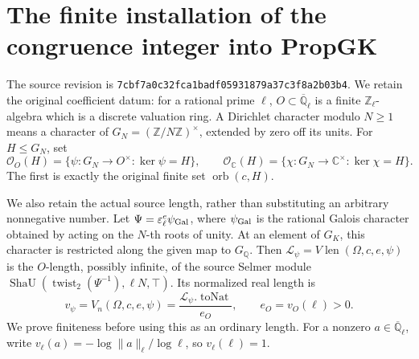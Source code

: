 \section{The finite installation of the congruence integer into PropGK}
\label{sec:prop-gk-installation-v046}


The source revision is
\texttt{7cbf7a0c32fca1badf05931879a37c3f8a2b03b4}.
We retain the original coefficient datum: for a rational prime
\(\ell\), \(O\subset\overline{\mathbb Q}_\ell\) is a finite
\(\mathbb Z_\ell\)-algebra which is a discrete valuation ring.
A Dirichlet character modulo \(N\ge1\) means a character of
\(G_N=(\mathbb Z/N\mathbb Z)^\times\), extended by zero off its
units. For \(H\le G_N\), set
\[
 \mathcal O_O(H)=\{\psi:G_N\to O^\times:\ker\psi=H\},\qquad
 \mathcal O_{\mathbb C}(H)=
       \{\chi:G_N\to\mathbb C^\times:\ker\chi=H\}.
 \tag{PGK.1}
\]
The first is exactly the original finite set \(\operatorname{orb}(c,H)\).

We also retain the actual source length, rather than substituting
an arbitrary nonnegative number. Let
\(\Psi=\varepsilon_\ell^e\psi_{\rm Gal}\), where
\(\psi_{\rm Gal}\) is the rational Galois character obtained by
acting on the \(N\)-th roots of unity. At an element of \(G_K\),
this character is restricted along the given map to \(G_{\mathbb Q}\).
Then
\(\mathcal L_\psi=V\!\operatorname{len}(\Omega,c,e,\psi)\) is the
\(O\)-length, possibly infinite, of the source Selmer module
\(\operatorname{ShaU}(\operatorname{twist}_2(\Psi^{-1}),\ell N,\top)\).
Its normalized real length is
\[
 v_\psi=V_n(\Omega,c,e,\psi)
       =\frac{\mathcal L_\psi.\operatorname{toNat}}{e_O},
 \qquad e_O=v_O(\ell)>0 .                                      \tag{PGK.2}
\]
We prove finiteness before using this as an ordinary length.
For a nonzero \(a\in\overline{\mathbb Q}_\ell\), write
\(v_\ell(a)=-\log\lVert a\rVert_\ell/\log\ell\), so
\(v_\ell(\ell)=1\).


